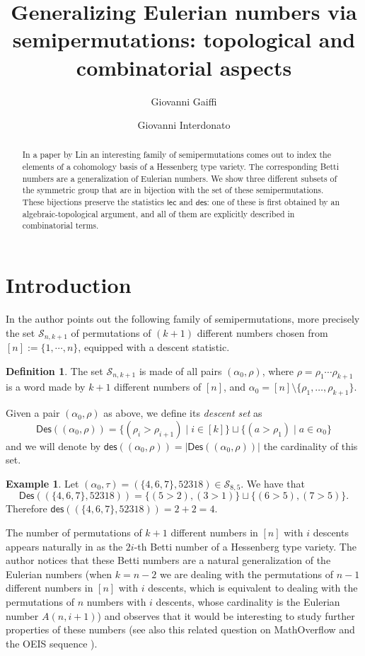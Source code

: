 \documentclass[a4paper]{amsart}
\title{Generalizing Eulerian numbers via semipermutations:  topological  and combinatorial aspects}
\author{Giovanni Gaiffi}
\author{Giovanni Interdonato}
\newcommand{\Des}{\mathsf{Des}}
\newcommand{\des}{\mathsf{des}}
\newcommand{\lec}{\mathsf{lec}}
\theoremstyle{definition}
\newtheorem{definition}[theorem]{Definition}
\newtheorem{example}[theorem]{Example}
\theoremstyle{remark}
\numberwithin{equation}{section}
\begin{document}
	
\begin{abstract}
In a paper by Lin an interesting family of semipermutations comes out to index the elements of a cohomology basis of a Hessenberg type variety. The corresponding Betti numbers are a generalization of Eulerian numbers. We show three different subsets of the symmetric group that are in bijection with the set of these semipermutations. These bijections  preserve the statistics \(\lec\) and \(\des\): one of these is first obtained by  an algebraic-topological argument, and all of them are explicitly described in combinatorial terms.
\end{abstract}

\maketitle
\tableofcontents



\section*{Introduction}
In \cite{Lin24} the author points out the following family of semipermutations, more precisely the set $\mathcal{S}_{n,k+1}$ of permutations of $(k+1)$ different numbers chosen from $[n]:=\{1,\cdots,n\}$, equipped with a descent statistic. 

 \begin{definition}	 

The set $\mathcal{S}_{n,k+1}$ is made of all pairs $(\alpha_0,\rho)$, where $\rho=\rho_1\cdots\rho_{k+1}$ is a word made by $k+1$ different numbers of $[n]$, and $\alpha_0=[n]\setminus\{\rho_1,\dots,\rho_{k+1}\}$.

Given a pair $(\alpha_0,\rho)$ as above, we define its  {\em descent set} as $$\Des((\alpha_0,\rho))=\{(\rho_i>\rho_{i+1})\mid i\in[k]\}\sqcup\{(a>\rho_1)\mid a\in\alpha_0 \}$$ and we will denote by $\des((\alpha_0,\rho))=|\Des((\alpha_0,\rho))|$ the cardinality of this set.
\end{definition}  

\begin{example}
Let $(\alpha_0,\tau)=(\{4,6,7\},52318)\in \mathcal{S}_{8,5}$.
We have that $$\Des((\{4,6,7\},52318))=\{(5>2),(3>1)\}\sqcup\{(6>5),(7>5)\}.$$
Therefore $\des((\{4,6,7\},52318))=2+2=4$.
\end{example}

The number of    permutations of $k+1$ different numbers in $[n]$ with $i$ descents appears naturally in \cite{Lin24} as the \(2i\)-th Betti number of a Hessenberg type variety.
The author notices  that these Betti numbers are a  natural generalization of the Eulerian numbers (when \(k=n-2\) we are dealing with  the permutations of \(n-1\) different numbers in $[n]$ with \(i\) descents, which is equivalent to dealing with the permutations of \(n\) numbers with \(i\) descents, whose cardinality is  the Eulerian number $A(n,i+1)$) and observes  that it would   be interesting to study further properties of these numbers (see also this related question on MathOverflow \cite{MOF25} and the OEIS sequence \cite{OEIS_A381706}).
\end{document}
